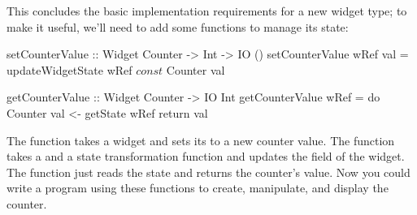 This concludes the basic implementation requirements for a new widget
type; to make it useful, we'll need to add some functions to manage
its state:

\begin{haskellcode}
 setCounterValue :: Widget Counter -> Int -> IO ()
 setCounterValue wRef val =
    updateWidgetState wRef $ const $ Counter val

 getCounterValue :: Widget Counter -> IO Int
 getCounterValue wRef = do
    Counter val <- getState wRef
    return val
\end{haskellcode}

The  function takes a  widget and sets
its  to a new counter value.  The 
function takes a  and a state transformation function and
updates the  field of the widget.  The 
function just reads the state and returns the counter's value.  Now
you could write a program using these functions to create, manipulate,
and display the counter.
